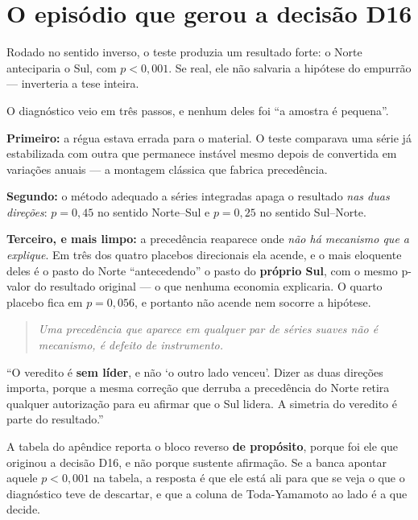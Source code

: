 \section{O episódio que gerou a decisão D16}

Rodado no sentido inverso, o teste produzia um resultado forte: o Norte
anteciparia o Sul, com $p < 0{,}001$. Se real, ele não salvaria a hipótese do
empurrão --- inverteria a tese inteira.

O diagnóstico veio em três passos, e nenhum deles foi ``a amostra é pequena''.

\vspace{4pt}
\textbf{Primeiro:} a régua estava errada para o material. O teste comparava uma
série já estabilizada com outra que permanece instável mesmo depois de
convertida em variações anuais --- a montagem clássica que fabrica precedência.

\textbf{Segundo:} o método adequado a séries integradas apaga o resultado
\emph{nas duas direções}: $p = 0{,}45$ no sentido Norte--Sul e $p = 0{,}25$ no
sentido Sul--Norte.

\textbf{Terceiro, e mais limpo:} a precedência reaparece onde \emph{não há
mecanismo que a explique}. Em três dos quatro placebos direcionais ela acende, e
o mais eloquente deles é o pasto do Norte ``antecedendo'' o pasto do
\textbf{próprio Sul}, com o mesmo p-valor do resultado original --- o que
nenhuma economia explicaria. O quarto placebo fica em $p = 0{,}056$, e portanto
não acende nem socorre a hipótese.

\begin{quote}\itshape\color{cortinta}
Uma precedência que aparece em qualquer par de séries suaves não é mecanismo, é
defeito de instrumento.
\end{quote}

\begin{nabanca}
``O veredito é \textbf{sem líder}, e não `o outro lado venceu'. Dizer as duas
direções importa, porque a mesma correção que derruba a precedência do Norte
retira qualquer autorização para eu afirmar que o Sul lidera. A simetria do
veredito é parte do resultado.''
\end{nabanca}

\begin{armadilha}
A tabela do apêndice reporta o bloco reverso \textbf{de propósito}, porque foi
ele que originou a decisão D16, e não porque sustente afirmação. Se a banca
apontar aquele $p < 0{,}001$ na tabela, a resposta é que ele está ali para que
se veja o que o diagnóstico teve de descartar, e que a coluna de Toda-Yamamoto
ao lado é a que decide.
\end{armadilha}

